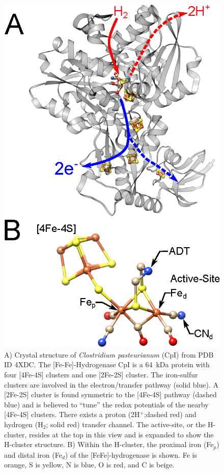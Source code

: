 \begin{figure}[htpb]
\centering
\includegraphics{Kapitel/Ch1-images/CpI-geometry.eps}
\caption[Crystal structure of {\em Clostridium pasteurianum} (CpI).]{A) Crystal structure of {\em Clostridium pasteurianum} (CpI) from PDB ID 4XDC. \cite{FeFeCry} The [Fe-Fe]-Hydrogenase CpI is a 64~kDa protein with four [4Fe-4S] clusters and one [2Fe-2S] cluster. The iron-sulfur  clusters  are involved  in  the electron\-/transfer  pathway (solid blue). A [2Fe-2S] cluster is found symmetric to the [4Fe-4S] pathway (dashed blue) and is believed to ``tune'' the redox potentials of the nearby [4Fe-4S] clusters. There exists a proton (2H$^+$;dashed red) and hydrogen (H$_2$; solid red) transfer channel. The active-site, or the H-cluster, resides at the top in this view and is expanded to show the H-cluster structure. B) Within the H-cluster, the proximal iron (Fe$_p$) and distal iron (Fe$_d$) of the [FeFe]-hydrogenase is shown. Fe is orange, S is yellow, N is blue, O is red, and C is beige.}
 \label{fig:CpIGeo}
\end{figure}

